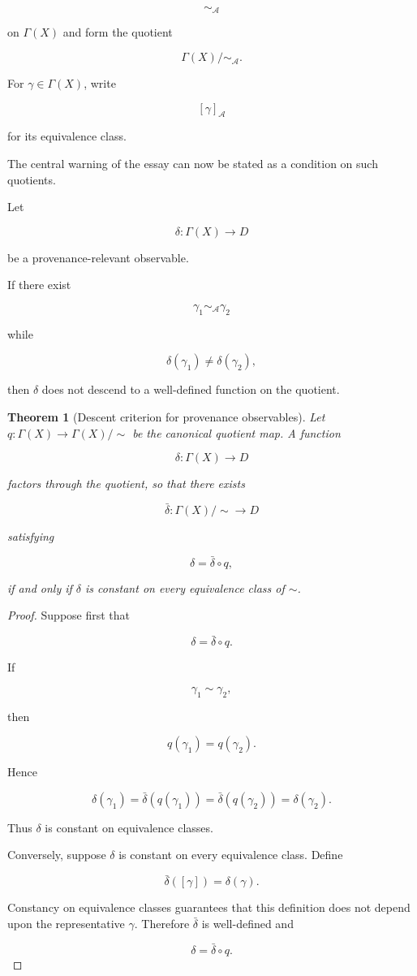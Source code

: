 \documentclass[
  11pt,
  a4paper,
  DIV=12,
  BCOR=0mm,
  parskip=half-
]{scrartcl}
\theoremstyle{definition}
\theoremstyle{plain}
\newtheorem{theorem}[definition]{Theorem}
\theoremstyle{remark}
\begin{document}
\[
  \sim_{\mathcal A}
\]

on \(\Gamma(X)\) and form the quotient

\[
  \Gamma(X)/{\sim_{\mathcal A}}.
\]

For \(\gamma\in\Gamma(X)\), write

\[
  [\gamma]_{\mathcal A}
\]

for its equivalence class.

The central warning of the essay can now be stated as a condition on such
quotients.

Let

\[
  \delta:
  \Gamma(X)\to D
\]

be a provenance-relevant observable.

If there exist

\[
  \gamma_1\sim_{\mathcal A}\gamma_2
\]

while

\[
  \delta(\gamma_1)\neq\delta(\gamma_2),
\]

then \(\delta\) does not descend to a well-defined function on the quotient.

\begin{theorem}[Descent criterion for provenance observables]
\label{thm:descent-criterion}
Let \(q:\Gamma(X)\to\Gamma(X)/{\sim}\) be the canonical quotient map. A
function

\[
  \delta:\Gamma(X)\to D
\]

factors through the quotient, so that there exists

\[
  \bar\delta:
  \Gamma(X)/{\sim}\to D
\]

satisfying

\[
  \delta=\bar\delta\circ q,
\]

if and only if \(\delta\) is constant on every equivalence class of
\(\sim\).
\end{theorem}

\begin{proof}
Suppose first that

\[
  \delta=\bar\delta\circ q.
\]

If

\[
  \gamma_1\sim\gamma_2,
\]

then

\[
  q(\gamma_1)=q(\gamma_2).
\]

Hence

\[
  \delta(\gamma_1)
  =
  \bar\delta(q(\gamma_1))
  =
  \bar\delta(q(\gamma_2))
  =
  \delta(\gamma_2).
\]

Thus \(\delta\) is constant on equivalence classes.

Conversely, suppose \(\delta\) is constant on every equivalence class. Define

\[
  \bar\delta([\gamma])
  =
  \delta(\gamma).
\]

Constancy on equivalence classes guarantees that this definition does not
depend upon the representative \(\gamma\). Therefore \(\bar\delta\) is
well-defined and

\[
  \delta=\bar\delta\circ q.
\]
\end{proof}
\end{document}
